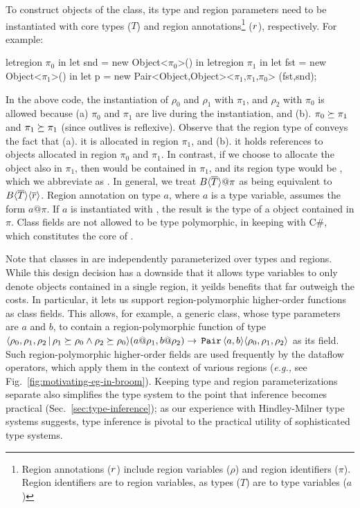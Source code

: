 To construct objects of the  class, its type and region
parameters need to be instantiated with core types ($T$) and region
annotations\footnote{Region annotations ($r$) include region
variables ($\rho$) and region identifiers ($\pi$). Region identifiers
are to region variables, as types ($T$) are to type variables ($a$)}
($r$), respectively. For example:
\begin{codejava}

letregion $\pi_0$ in
  let snd = new Object<$\pi_0$>() in
  letregion $\pi_1$ in
    let fst = new Object<$\pi_1$>() in
    let p = new Pair<Object,Object><$\pi_1$,$\pi_1$,$\pi_0$> (fst,snd);
\end{codejava}
In the above code, the instantiation of $\rho_0$ and $\rho_1$ with
$\pi_1$, and $\rho_2$ with $\pi_0$ is allowed because (a) $\pi_0$
and $\pi_1$ are live during the instantiation, and (b). $\pi_0
\succeq \pi_1$ and $\pi_1 \succeq \pi_1$ (since outlives is
reflexive). Observe that the region type of  conveys
the fact that (a). it is allocated in region $\pi_1$, and (b). it
holds references to objects allocated in region $\pi_0$ and $\pi_1$.
In contrast, if we choose to allocate the  object also in
$\pi_1$, then  would be contained in $\pi_1$, and its region
type would be , which
we abbreviate as . In general, we treat
$B\inang{\tbar}@\pi$ as being equivalent to
$B\langle \overline{T} \rangle\langle \overline{r} \rangle$. Region annotation on type $a$, where
$a$ is a type variable, assumes the form $a@\pi$. If $a$ is
instantiated with , the result is the type of a
 object contained in  $\pi$. Class fields are not allowed to
be type polymorphic, in keeping with C\#, which constitutes the core
of \name. 

Note that classes in \FB are independently parameterized over types
and regions. While this design decision has a downside that it allows
type variables to only denote objects contained in a single region, it
yeilds benefits that far outweigh the costs. In particular, it lets us
support region-polymorphic higher-order functions as class fields.
This allows, for example, a generic class, whose type parameters are
$a$ and $b$, to contain a region-polymorphic function of type
$\langle \rho_0,\rho_1,\rho_2 \,|\, \rho_1 \succeq \rho_0 \wedge
\rho_2 \succeq \rho_0 \rangle(a@\rho_1,b@\rho_2) \rightarrow
\,{\tt Pair}\,\langle a,b \rangle\langle \rho_0,\rho_1,\rho_2 \rangle$ as its field. Such
region-polymorphic higher-order fields are used frequently by the
dataflow operators, which apply them in the context of various regions
(\emph{e.g.,} see Fig.~\ref{fig:motivating-eg-in-broom}). Keeping type
and region parameterizations separate also simplifies the type system
to the point that inference becomes practical
(Sec.~\ref{sec:type-inference}); as our experience with Hindley-Milner
type systems suggests, type inference is pivotal to the practical
utility of sophisticated type systems.

